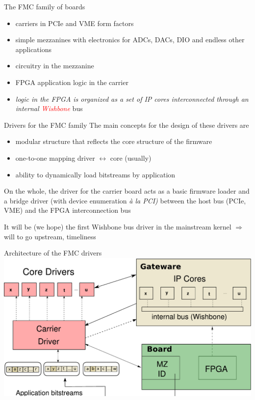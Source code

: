 \documentclass[compress,red]{beamer}
\begin{document}
\begin{frame}{The FMC family of boards}
\begin{itemize}
\item carriers in PCIe and VME form factors
\item simple mezzanines with electronics for ADCs, DACs, DIO and endless
    other applications
\item circuitry in the mezzanine
\item FPGA application logic in the carrier
\item \emph{logic in the FPGA is organized as a set of IP cores
    interconnected through an internal \textcolor{red}{Wishbone}}
    bus
\end{itemize}
\end{frame}
\begin{frame}{Drivers for the FMC family}
The main concepts for the design of these drivers are
\begin{itemize}
\pause
\item modular structure that reflects the core structure of the firmware
\pause
\item one-to-one mapping driver $\leftrightarrow$ core (usually)
\pause
\item ability to dynamically load bitstreams by application
\end{itemize}

\pause
On the whole, the driver for the carrier board acts as a basic firmware
loader and a bridge driver (with device enumeration
\emph{\`a la PCI)} between the host bus (PCIe, VME) and the FPGA
interconnection bus

\pause
It will be (we hope) the first Wishbone bus driver in the mainstream
kernel $\Rightarrow$ will to go upstream, timeliness
\end{frame}


\begin{frame}{Architecture of the FMC drivers}
\includegraphics[height=0.8\textheight]{driverarch.pdf}
\end{frame}
\end{document}
